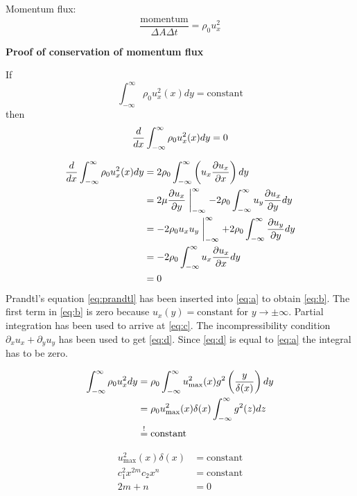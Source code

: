 Momentum flux:
\begin{equation}
\frac{\mathrm{momentum}}{\Delta A \Delta t} = \rho_0 u_x^2
\end{equation}

\begin{framed}
\textbf{Proof of conservation of momentum flux}

If
\begin{equation}
\int_{-\infty}^\infty \rho_0u_x^2(x)dy=\mathrm{constant}
\end{equation}
then
\begin{equation}
\frac{d }{d x}\int_{-\infty}^\infty \rho_0u_x^2(x)dy=0
\end{equation}

\begin{align}
\frac{d }{d x}\int_{-\infty}^\infty \rho_0u_x^2(x)dy &= 2\rho_0\int_{-\infty}^\infty\left(u_x\frac{\partial u_x}{\partial x}\right)dy \label{eq:a}\\
&= 2\mu\frac{\partial u_x}{\partial y}\biggm\vert_{-\infty}^\infty-2\rho_0\int_{-\infty}^\infty u_y\frac{\partial u_x}{\partial y}dy \label{eq:b}\\
&=-2\rho_0u_xu_y\biggm\vert_{-\infty}^\infty + 2\rho_0 \int_{-\infty}^\infty\frac{\partial u_y}{\partial y}dy \label{eq:c}\\
&= -2\rho_0\int_{-\infty}^\infty u_x\frac{\partial u_x}{\partial x}dy \label{eq:d}\\
&= 0
\end{align}
Prandtl's equation \eqref{eq:prandtl} has been inserted into \eqref{eq:a} to obtain \eqref{eq:b}. The first term in \eqref{eq:b} is zero because $u_x(y)=\text{constant}$ for $y\rightarrow\pm\infty$. Partial integration has been used to arrive at \eqref{eq:c}. The incompressibility condition $\partial_xu_x+\partial_yu_y$ has been used to get \eqref{eq:d}. Since \eqref{eq:d} is equal to \eqref{eq:a} the integral has to be zero.
\end{framed}

\begin{align}
\int_{-\infty}^\infty\rho_0u_x^2dy &= \rho_0\int_{-\infty}^\infty u_\mathrm{max}^2(x)g^2\left(\frac{y}{\delta(x)}\right)dy\\
&= \rho_0u_\mathrm{max}^2(x)\delta(x)\int_{-\infty}^\infty g^2(z)dz\\
&\overset{!}{=} \mathrm{constant}
\end{align}

\begin{align}
u_\mathrm{max}^2(x)\delta(x)&=\mathrm{constant}\\
c_1^2x^{2m}c_2x^n &= \mathrm{constant}\\
2m+n &= 0
\end{align}

